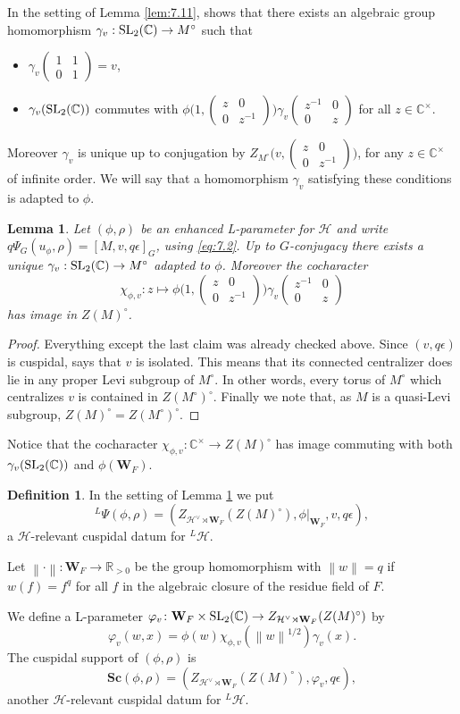 \documentclass[11pt]{amsart}
\newtheorem{lem}[thm]{Lemma}
\theoremstyle{definition}
\newtheorem{defn}[thm]{Definition}
\providecommand{\norm}[1]{\left\| #1 \right\|}
\newcommand{\mb}{\mathbf}
\newcommand{\R}{\mathbb R}
\newcommand{\C}{\mathbb C}
\newcommand{\matje}[4]{\left(\begin{smallmatrix} #1 & #2 \\ 
#3 & #4 \end{smallmatrix}\right)}
\def\SL{{\rm SL}}
\def\cH{{\mathcal H}}
\begin{document}
In the setting of Lemma \ref{lem:7.11}, \cite[\S 2.4]{KaLu} shows that there exists
an algebraic group homomorphism $\gamma_v : \SL_2 (\C) \to M^\circ$ such that
\begin{itemize}
\item $\gamma_v \matje{1}{1}{0}{1} = v$,
\item $\gamma_v (\SL_2 (\C))$ commutes with $\phi \big( 1, \matje{z}{0}{0}{z^{-1}} \big)
\gamma_v \matje{z^{-1}}{0}{0}{z}$ for all $z \in \C^\times$.
\end{itemize}
Moreover $\gamma_v$ is unique up to conjugation by $Z_{M^\circ}\big( v, 
\matje{z}{0}{0}{z^{-1}} \big)$, for any $z \in \C^\times$ of infinite order. We will
say that a homomorphism $\gamma_v$ satisfying these conditions is adapted to $\phi$.

\begin{lem}\label{lem:7.12}
Let $(\phi,\rho)$ be an enhanced L-parameter for $\cH$ and write
$q \Psi_G (u_\phi,\rho) = [M,v,q\epsilon]_G$, using \eqref{eq:7.2}. Up to $G$-conjugacy
there exists a unique $\gamma_v : \SL_2 (\C) \to M^\circ$ adapted to $\phi$. 
Moreover the cocharacter
\[
\chi_{\phi,v} \colon z \mapsto \phi \big( 1, \matje{z}{0}{0}{z^{-1}} \big)
\gamma_v \matje{z^{-1}}{0}{0}{z}
\]
has image in $Z(M)^\circ$.
\end{lem}
\begin{proof}
Everything except the last claim was already checked above. Since $(v,q \epsilon)$ is
cuspidal, \cite[Proposition 2.7]{Lus1} says that $v$ is isolated. This means that its
connected centralizer does lie in any proper Levi subgroup of $M^\circ$. In other words,
every torus of $M^\circ$ which centralizes $v$ is contained in $Z(M^\circ)^\circ$. 
Finally we note that, as $M$ is a quasi-Levi subgroup, $Z(M)^\circ = Z(M^\circ)^\circ$.
\end{proof}

Notice that the cocharacter $\chi_{\phi,v} : \C^\times \to Z(M)^\circ$ has image 
commuting with both $\gamma_v (\SL_2 (\C))$ and $\phi (\mb W_F)$.

\begin{defn}\label{def:7.8}
In the setting of Lemma \ref{lem:7.12} we put 
\[
{}^L \Psi (\phi,\rho) = (Z_{\cH^\vee \rtimes \mb W_F}(Z(M)^\circ),
\phi |_{\mb W_F},v,q \epsilon),
\]
a $\cH$-relevant cuspidal datum for ${}^L \cH$.

Let $\norm{\cdot} : \mb W_F \to \R_{>0}$ be the group homomorphism with $\norm{w} = q$ if
$w(f) = f^q$ for all $f$ in the algebraic closure of the residue field of $F$.

We define a L-parameter $\varphi_v \colon \mb W_F \times \SL_2 (\C) \to 
Z_{\cH^\vee \rtimes \mb W_F}(Z (M)^\circ)$ by
\[
\varphi_v (w,x) = \phi (w) \chi_{\phi,v}(\norm{w}^{1/2}) \gamma_v (x) .
\]
The cuspidal support of $(\phi,\rho)$ is 
\[
\mathbf{Sc} (\phi,\rho) = (Z_{\cH^\vee \rtimes \mb W_F}(Z(M)^\circ),\varphi_v,q \epsilon),
\]
another $\cH$-relevant cuspidal datum for ${}^L \cH$.
\end{defn}
\end{document}
